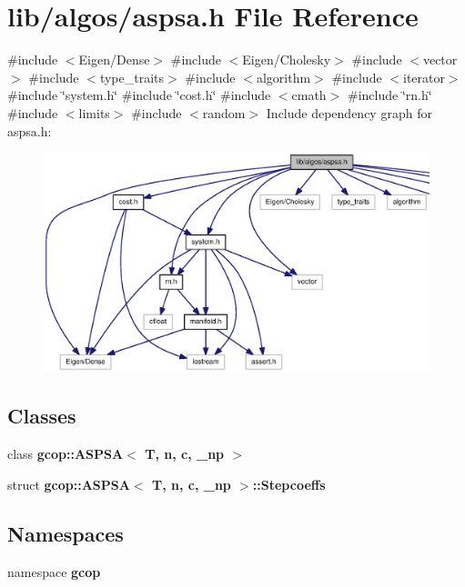 \section{lib/algos/aspsa.h \-File \-Reference}
\label{aspsa_8h}
{\ttfamily \#include $<$\-Eigen/\-Dense$>$}\*
{\ttfamily \#include $<$\-Eigen/\-Cholesky$>$}\*
{\ttfamily \#include $<$vector$>$}\*
{\ttfamily \#include $<$type\-\_\-traits$>$}\*
{\ttfamily \#include $<$algorithm$>$}\*
{\ttfamily \#include $<$iterator$>$}\*
{\ttfamily \#include \char`\"{}system.\-h\char`\"{}}\*
{\ttfamily \#include \char`\"{}cost.\-h\char`\"{}}\*
{\ttfamily \#include $<$cmath$>$}\*
{\ttfamily \#include \char`\"{}rn.\-h\char`\"{}}\*
{\ttfamily \#include $<$limits$>$}\*
{\ttfamily \#include $<$random$>$}\*
\-Include dependency graph for aspsa.\-h\-:
\nopagebreak
\begin{figure}[H]
\begin{center}
\leavevmode
\includegraphics[width=350pt]{aspsa_8h__incl}
\end{center}
\end{figure}
\subsection*{\-Classes}
\begin{DoxyCompactItemize}
\item 
class {\bf gcop\-::\-A\-S\-P\-S\-A$<$ T, n, c, \-\_\-np $>$}
\item 
struct {\bf gcop\-::\-A\-S\-P\-S\-A$<$ T, n, c, \-\_\-np $>$\-::\-Stepcoeffs}
\end{DoxyCompactItemize}
\subsection*{\-Namespaces}
\begin{DoxyCompactItemize}
\item 
namespace {\bf gcop}
\end{DoxyCompactItemize}
